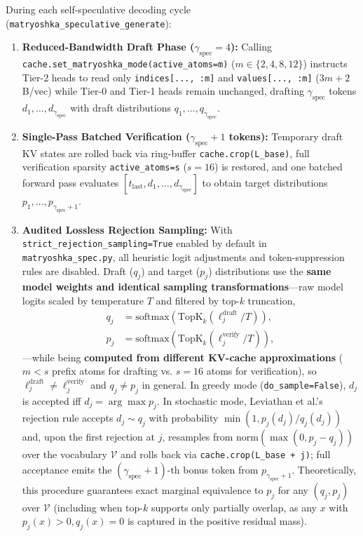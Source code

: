 \documentclass[conference]{IEEEtran}
\begin{document}
During each self-speculative decoding cycle (\texttt{matryoshka\_speculative\_generate}):
\begin{enumerate}
    \item \textbf{Reduced-Bandwidth Draft Phase ($\gamma_{\text{spec}} = 4$):} Calling \texttt{cache.set\_matryoshka\_mode(active\_atoms=m)} ($m \in \{2, 4, 8, 12\}$) instructs Tier-2 heads to read only \texttt{indices[..., :m]} and \texttt{values[..., :m]} ($3m + 2$ B/vec) while Tier-0 and Tier-1 heads remain unchanged, drafting $\gamma_{\text{spec}}$ tokens $d_1, \dots, d_{\gamma_{\text{spec}}}$ with draft distributions $q_1, \dots, q_{\gamma_{\text{spec}}}$.
    \item \textbf{Single-Pass Batched Verification ($\gamma_{\text{spec}} + 1$ tokens):} Temporary draft KV states are rolled back via ring-buffer \texttt{cache.crop(L\_base)}, full verification sparsity \texttt{active\_atoms=s} ($s = 16$) is restored, and one batched forward pass evaluates $[t_{\text{last}}, d_1, \dots, d_{\gamma_{\text{spec}}}]$ to obtain target distributions $p_1, \dots, p_{\gamma_{\text{spec}}+1}$.
    \item \textbf{Audited Lossless Rejection Sampling:} With \texttt{strict\_rejection\_sampling=True} enabled by default in \texttt{matryoshka\_spec.py}, all heuristic logit adjustments and token-suppression rules are disabled. Draft ($q_j$) and target ($p_j$) distributions use the \textbf{same model weights and identical sampling transformations}---raw model logits scaled by temperature $T$ and filtered by top-$k$ truncation,
    \begin{equation}
    \begin{aligned}
    q_j &= \text{softmax}\!\left(\text{TopK}_k(\ell^{\text{draft}}_j / T)\right), \\
    p_j &= \text{softmax}\!\left(\text{TopK}_k(\ell^{\text{verify}}_j / T)\right),
    \end{aligned}
    \label{eq:spec_dists}
    \end{equation}
    ---while being \textbf{computed from different KV-cache approximations} ($m < s$ prefix atoms for drafting vs. $s = 16$ atoms for verification), so $\ell^{\text{draft}}_j \ne \ell^{\text{verify}}_j$ and $q_j \ne p_j$ in general. In greedy mode (\texttt{do\_sample=False}), $d_j$ is accepted iff $d_j = \arg\max p_j$. In stochastic mode, Leviathan et al.'s rejection rule \cite{b12} accepts $d_j \sim q_j$ with probability $\min(1, p_j(d_j)/q_j(d_j))$ and, upon the first rejection at $j$, resamples from $\text{norm}(\max(0, p_j - q_j))$ over the vocabulary $\mathcal{V}$ and rolls back via \texttt{cache.crop(L\_base + j)}; full acceptance emits the $(\gamma_{\text{spec}} + 1)$-th bonus token from $p_{\gamma_{\text{spec}}+1}$. Theoretically, this procedure guarantees exact marginal equivalence to $p_j$ for any $(q_j, p_j)$ over $\mathcal{V}$ (including when top-$k$ supports only partially overlap, as any $x$ with $p_j(x) > 0, q_j(x) = 0$ is captured in the positive residual mass).
\end{enumerate}
\end{document}

